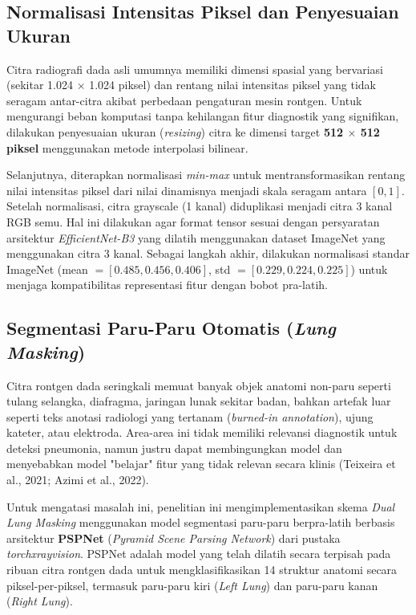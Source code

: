 \documentclass[12pt,a4paper,oneside]{book}
\begin{document}
\subsection{Normalisasi Intensitas Piksel dan Penyesuaian Ukuran}

Citra radiografi dada asli umumnya memiliki dimensi spasial yang bervariasi (sekitar 1.024 $\times$ 1.024 piksel) dan rentang nilai intensitas piksel yang tidak seragam antar-citra akibat perbedaan pengaturan mesin rontgen. Untuk mengurangi beban komputasi tanpa kehilangan fitur diagnostik yang signifikan, dilakukan penyesuaian ukuran (\textit{resizing}) citra ke dimensi target \textbf{512 $\times$ 512 piksel} menggunakan metode interpolasi bilinear.

Selanjutnya, diterapkan normalisasi \textit{min-max} untuk mentransformasikan rentang nilai intensitas piksel dari nilai dinamisnya menjadi skala seragam antara $[0, 1]$. Setelah normalisasi, citra grayscale (1 kanal) diduplikasi menjadi citra 3 kanal RGB semu. Hal ini dilakukan agar format tensor sesuai dengan persyaratan arsitektur \textit{EfficientNet-B3} yang dilatih menggunakan dataset ImageNet yang menggunakan citra 3 kanal. Sebagai langkah akhir, dilakukan normalisasi standar ImageNet (mean $= [0.485, 0.456, 0.406]$, std $= [0.229, 0.224, 0.225]$) untuk menjaga kompatibilitas representasi fitur dengan bobot pra-latih.

\subsection{Segmentasi Paru-Paru Otomatis (\textit{Lung Masking})}

Citra rontgen dada seringkali memuat banyak objek anatomi non-paru seperti tulang selangka, diafragma, jaringan lunak sekitar badan, bahkan artefak luar seperti teks anotasi radiologi yang tertanam (\textit{burned-in annotation}), ujung kateter, atau elektroda. Area-area ini tidak memiliki relevansi diagnostik untuk deteksi pneumonia, namun justru dapat membingungkan model dan menyebabkan model "belajar" fitur yang tidak relevan secara klinis (Teixeira et al., 2021; Azimi et al., 2022).

Untuk mengatasi masalah ini, penelitian ini mengimplementasikan skema \textit{Dual Lung Masking} menggunakan model segmentasi paru-paru berpra-latih berbasis arsitektur \textbf{PSPNet} (\textit{Pyramid Scene Parsing Network}) dari pustaka \textit{torchxrayvision}. PSPNet adalah model yang telah dilatih secara terpisah pada ribuan citra rontgen dada untuk mengklasifikasikan 14 struktur anatomi secara piksel-per-piksel, termasuk paru-paru kiri (\textit{Left Lung}) dan paru-paru kanan (\textit{Right Lung}).
\end{document}
